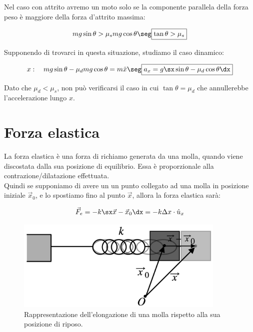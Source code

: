 Nel caso con attrito avremo un moto solo se la componente parallela della forza peso è maggiore della forza d'attrito massima:

\begin{equation}
mg\sin\theta > \mu_s mg\cos\theta\seg \boxed{\tan\theta>\mu_s}
\end{equation}

Supponendo di trovarci in questa situazione, studiamo il caso dinamico:

\begin{equation}
x:\quad mg\sin\theta -\mu_d mg\cos\theta = m\ddot x\seg \boxed{a_x = g\sx\sin\theta-\mu_d\cos\theta\dx}
\end{equation}

Dato che $\mu_d<\mu_s$, non può verificarsi il caso in cui $\tan\theta =\mu_d$ che annullerebbe l'accelerazione lungo $x$.




\section{Forza elastica}
La forza elastica è una forza di richiamo generata da una molla, quando viene discostata dalla sua posizione di equilibrio. Essa è proporzionale alla contrazione/dilatazione effettuata.\\ Quindi se supponiamo di avere un un punto collegato ad una molla in posizione iniziale $\vec x_0$, e lo spostiamo fino al punto $\vec x$, allora la forza elastica sarà:

\begin{equation}
\vec F_e = -k\sx\vec x-\vec x_0\dx = -k\Delta x\cdot\hat u_x
\end{equation}

\begin{figure}[htbp]
\begin{center}
\includegraphics[width=10cm]{images/molla.png}
\caption{Rappresentazione dell'elongazione di una molla rispetto alla sua posizione di riposo.}
\label{default}
\end{center}
\end{figure}


